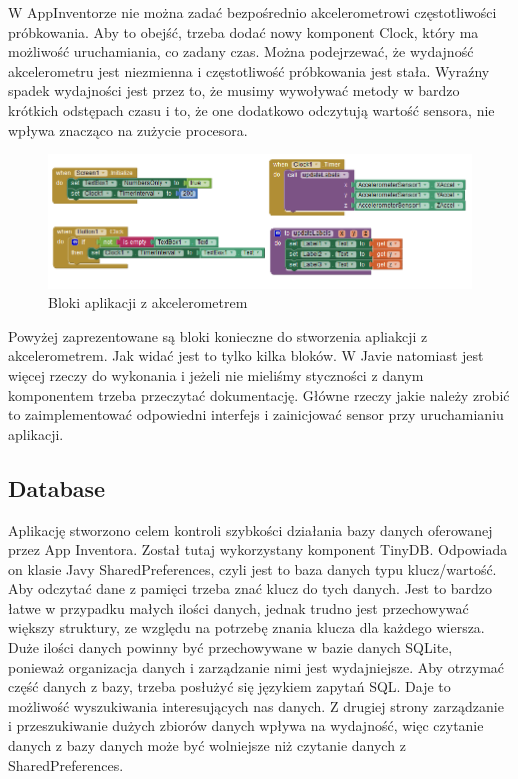 W AppInventorze nie można zadać bezpośrednio akcelerometrowi częstotliwości próbkowania. Aby to obejść, trzeba dodać nowy komponent Clock, który ma możliwość uruchamiania, co zadany czas. Można podejrzewać, że wydajność akcelerometru jest niezmienna i częstotliwość próbkowania jest stała. Wyraźny spadek wydajności jest przez to, że musimy wywoływać metody w bardzo krótkich odstępach czasu i to, że one dodatkowo odczytują wartość sensora, nie wpływa znacząco na zużycie procesora.


\begin{figure}[H]
\centering\includegraphics[width=14cm]{figures/apps/akcelerometerAI}
\caption{Bloki aplikacji z akcelerometrem}
\end{figure}

Powyżej zaprezentowane są bloki konieczne do stworzenia apliakcji z akcelerometrem. Jak widać jest to tylko kilka bloków. W Javie natomiast jest więcej rzeczy do wykonania i jeżeli nie mieliśmy styczności z danym komponentem trzeba przeczytać dokumentację. Główne rzeczy jakie należy zrobić to zaimplementować odpowiedni interfejs i zainicjować sensor przy uruchamianiu aplikacji.




\subsection{Database}

Aplikację stworzono celem kontroli szybkości działania bazy danych oferowanej przez App Inventora. Został tutaj wykorzystany komponent TinyDB. Odpowiada on klasie Javy SharedPreferences, czyli jest to baza danych typu klucz/wartość. Aby odczytać dane z pamięci trzeba znać klucz do tych danych. Jest to bardzo łatwe w przypadku małych ilości danych, jednak trudno jest przechowywać większy struktury, ze względu na potrzebę znania klucza dla każdego wiersza. Duże ilości danych powinny być przechowywane w bazie danych SQLite, ponieważ organizacja danych i zarządzanie nimi jest wydajniejsze. Aby otrzymać część danych z bazy, trzeba posłużyć się językiem zapytań SQL. Daje to możliwość wyszukiwania interesujących nas danych. Z drugiej strony zarządzanie i przeszukiwanie dużych zbiorów danych wpływa na wydajność, więc czytanie danych z bazy danych może być wolniejsze niż czytanie danych z SharedPreferences.

